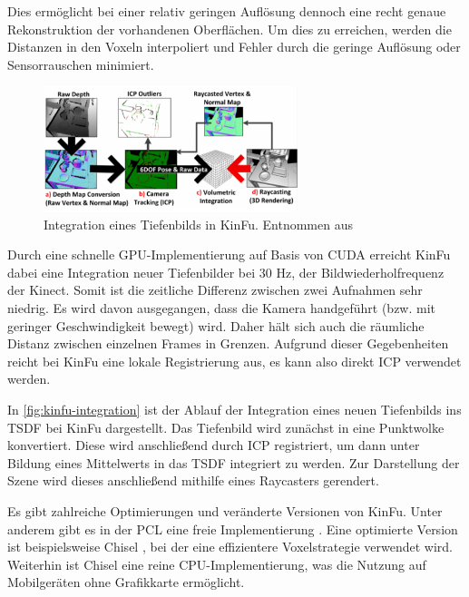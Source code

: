 Dies ermöglicht bei einer relativ geringen Auflösung dennoch eine recht genaue Rekonstruktion der vorhandenen Oberflächen.
Um dies zu erreichen, werden die Distanzen in den Voxeln interpoliert und Fehler durch die geringe Auflösung oder Sensorrauschen minimiert.

\begin{figure}[H]
	\centering
	\includegraphics[width=0.66\textwidth, frame]{images/kinfu-integration.png}
	\caption{Integration eines Tiefenbilds in \ac{KinFu}. Entnommen aus \cite{izadi2011kinectfusion}}
	\label{fig:kinfu-integration}
\end{figure}

Durch eine schnelle GPU-Implementierung auf Basis von CUDA erreicht \ac{KinFu} dabei eine Integration neuer Tiefenbilder bei 30 Hz, der Bildwiederholfrequenz der Kinect.
Somit ist die zeitliche Differenz zwischen zwei Aufnahmen sehr niedrig.
Es wird davon ausgegangen, dass die Kamera handgeführt (bzw. mit geringer Geschwindigkeit bewegt) wird.
Daher hält sich auch die räumliche Distanz zwischen einzelnen Frames in Grenzen.
Aufgrund dieser Gegebenheiten reicht bei \ac{KinFu} eine lokale Registrierung aus, es kann also direkt \ac{ICP} verwendet werden.

In \autoref{fig:kinfu-integration} ist der Ablauf der Integration eines neuen Tiefenbilds ins \ac{TSDF} bei \ac{KinFu} dargestellt.
Das Tiefenbild wird zunächst in eine Punktwolke konvertiert.
Diese wird anschließend durch \ac{ICP} registriert, um dann unter Bildung eines Mittelwerts in das \ac{TSDF} integriert zu werden.
Zur Darstellung der Szene wird dieses anschließend mithilfe eines Raycasters gerendert.


Es gibt zahlreiche Optimierungen und veränderte Versionen von \ac{KinFu}.
Unter anderem gibt es in der \ac{PCL} eine freie Implementierung \cite{pirovano2012kinfu}.
Eine optimierte Version ist beispielsweise Chisel \cite{klingensmith2015chisel}, bei der eine effizientere Voxelstrategie verwendet wird.
Weiterhin ist Chisel eine reine CPU-Implementierung, was die Nutzung auf Mobilgeräten ohne Grafikkarte ermöglicht.

